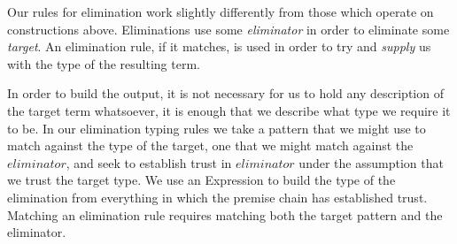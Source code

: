 Our rules for elimination work slightly differently from those which operate on
constructions above. Eliminations use some \emph{eliminator} in order to eliminate
some \emph{target}. An elimination rule, if it matches, is used in order to try
and \emph{supply} us with the type of the resulting term.

In order to build the output, it is not necessary for us to hold any description
of the target term whatsoever, it is enough that we describe what type we require
it to be. In our elimination typing rules we take a pattern that we might use to
match against the type of the target, one that we might match against the $eliminator$,
and seek to establish trust in $eliminator$ under the assumption that we trust the
target type. We use an Expression to build the type of the elimination from everything
in which the premise chain has established trust. Matching an elimination rule requires
matching both the target pattern and the eliminator.
\begin{code}%
\>[0]\AgdaSpace{}%
\AgdaSpace{}%
\AgdaSymbol{:}\AgdaSpace{}%
\AgdaSpace{}%
\<%
\\
\>[0][@{}l@{\AgdaIndent{0}}]%
\>[2]\<%
\\
\>[2][@{}l@{\AgdaIndent{0}}]%
\>[4]%
\>[16]\AgdaSymbol{:}%
\>[19]\AgdaSpace{}%
\<%
\\
%
\>[4]%
\>[16]\AgdaSymbol{:}%
\>[19]\AgdaSpace{}%
\<%
\\
%
\>[4]%
\>[16]\AgdaSymbol{:}%
\>[19]\AgdaFunction{Σ[}\AgdaSpace{}%
\AgdaSpace{}%
\AgdaSpace{}%
\AgdaSpace{}%
\AgdaSpace{}%
\AgdaFunction{]}\AgdaSpace{}%
\AgdaSpace{}%
\AgdaSpace{}%
\AgdaSpace{}%
\<%
\\
%
\>[4]%
\>[16]\AgdaSymbol{:}%
\>[19]\AgdaSpace{}%
\AgdaSymbol{(}\AgdaSpace{}%
\AgdaSymbol{)}\AgdaSpace{}%
\AgdaSpace{}%
\<%
\\
\>[0]\AgdaSpace{}%
\<%
\end{code}
